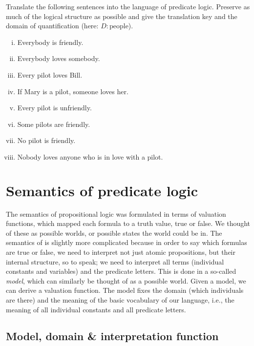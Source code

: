 \documentclass[nobib,nofonts]{tufte-handout}
\newcommand{\predlog}{\acro{PredLog}}
\begin{document}
{\begin{minipage}{1.0\textwidth}
    \begin{exercise}
      Translate the following sentences into the language of predicate logic. Preserve as much of   the logical structure as possible and give the translation key and the domain of   quantification (here: $D: \text{people}$).
      \begin{enumerate}[(i)]
        \item Everybody is friendly.
        \item Everybody loves somebody.
        \item Every pilot loves Bill.
        \item If Mary is a pilot, someone loves her.
        \item Every pilot is unfriendly.
        \item Some pilots are friendly.
        \item No pilot is friendly.
        \item Nobody loves anyone who is in love with a pilot.
      \end{enumerate}
    \end{exercise}
  \end{minipage}
}

\newpage

\section{Semantics of predicate logic}
\label{sec:semant-pred-logic}

The semantics of propositional logic was formulated in terms of valuation functions, which mapped each formula to a truth value, true or false.
We thought of these as possible worlds, or possible states the world could be in.
The semantics of \predlog is slightly more complicated because in order to say which formulas are true or false, we need to interpret not just atomic propositions, but their internal structure, so to speak; we need to interpret all terms (individual constants and variables) and the predicate letters.
This is done in a so-called \emph{model}, which can similarly be thought of as a possible world.
Given a model, we can derive a valuation function.
The model fixes the domain (which individuals are there) and the meaning of the basic vocabulary of our language, i.e., the meaning of all individual constants and all predicate letters.

\subsection{Model, domain \& interpretation function}
\label{sec:model}
\end{document}
